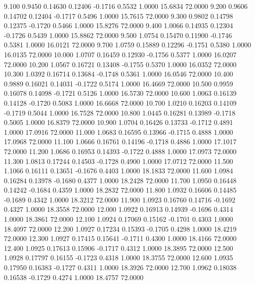    9.100   0.9450   0.14630   0.12406  -0.1716   0.5532   1.0000  15.6834  72.0000
   9.200   0.9606   0.14702   0.12404  -0.1717   0.5496   1.0000  15.7615  72.0000
   9.300   0.9802   0.14798   0.12375  -0.1720   0.5466   1.0000  15.8276  72.0000
   9.400   1.0066   0.14935   0.12304  -0.1726   0.5439   1.0000  15.8862  72.0000
   9.500   1.0754   0.15470   0.11900  -0.1746   0.5381   1.0000  16.0121  72.0000
   9.700   1.0759   0.15889   0.12296  -0.1751   0.5380   1.0000  16.0135  72.0000
  10.000   1.0707   0.16459   0.12930  -0.1756   0.5377   1.0000  16.0207  72.0000
  10.200   1.0567   0.16721   0.13408  -0.1755   0.5370   1.0000  16.0352  72.0000
  10.300   1.0392   0.16714   0.13684  -0.1748   0.5361   1.0000  16.0546  72.0000
  10.400   0.9889   0.16021   0.14031  -0.1722   0.5174   1.0000  16.4669  72.0000
  10.500   0.9959   0.16078   0.14098  -0.1721   0.5126   1.0000  16.5730  72.0000
  10.600   1.0063   0.16139   0.14128  -0.1720   0.5083   1.0000  16.6668  72.0000
  10.700   1.0210   0.16203   0.14109  -0.1719   0.5044   1.0000  16.7528  72.0000
  10.800   1.0445   0.16281   0.13989  -0.1718   0.5005   1.0000  16.8379  72.0000
  10.900   1.0704   0.16426   0.13733  -0.1712   0.4891   1.0000  17.0916  72.0000
  11.000   1.0683   0.16595   0.13966  -0.1715   0.4888   1.0000  17.0968  72.0000
  11.100   1.0666   0.16761   0.14196  -0.1718   0.4886   1.0000  17.1017  72.0000
  11.200   1.0686   0.16953   0.14393  -0.1722   0.4888   1.0000  17.0973  72.0000
  11.300   1.0813   0.17244   0.14503  -0.1728   0.4900   1.0000  17.0712  72.0000
  11.500   1.1066   0.16111   0.13651  -0.1676   0.4403   1.0000  18.1833  72.0000
  11.600   1.0984   0.16284   0.13978  -0.1680   0.4377   1.0000  18.2428  72.0000
  11.700   1.0950   0.16448   0.14242  -0.1684   0.4359   1.0000  18.2832  72.0000
  11.800   1.0932   0.16606   0.14485  -0.1689   0.4342   1.0000  18.3212  72.0000
  11.900   1.0923   0.16760   0.14716  -0.1692   0.4327   1.0000  18.3558  72.0000
  12.000   1.0922   0.16913   0.14939  -0.1696   0.4314   1.0000  18.3861  72.0000
  12.100   1.0924   0.17069   0.15162  -0.1701   0.4303   1.0000  18.4097  72.0000
  12.200   1.0927   0.17234   0.15393  -0.1705   0.4298   1.0000  18.4219  72.0000
  12.300   1.0927   0.17415   0.15641  -0.1711   0.4300   1.0000  18.4166  72.0000
  12.400   1.0925   0.17613   0.15906  -0.1717   0.4312   1.0000  18.3895  72.0000
  12.500   1.0928   0.17797   0.16155  -0.1723   0.4318   1.0000  18.3755  72.0000
  12.600   1.0935   0.17950   0.16383  -0.1727   0.4311   1.0000  18.3926  72.0000
  12.700   1.0962   0.18038   0.16538  -0.1729   0.4274   1.0000  18.4757  72.0000
